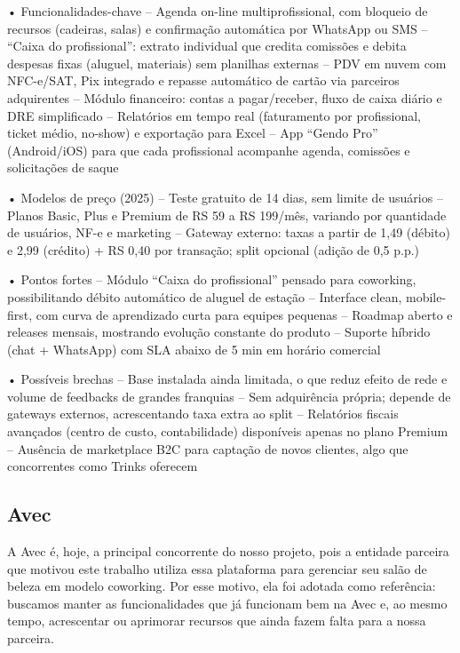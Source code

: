• Funcionalidades-chave
– Agenda on-line multi­profissional, com bloqueio de recursos (cadeiras, salas) e confirmação automática por WhatsApp ou SMS
– “Caixa do profissional”: extrato individual que credita comissões e debita despesas fixas (aluguel, materiais) sem planilhas externas
– PDV em nuvem com NFC-e/SAT, Pix integrado e repasse automático de cartão via parceiros adquirentes
– Módulo financeiro: contas a pagar/receber, fluxo de caixa diário e DRE simplificado
– Relatórios em tempo real (faturamento por profissional, ticket médio, no-show) e exportação para Excel
– App “Gendo Pro” (Android/iOS) para que cada profissional acompanhe agenda, comissões e solicitações de saque

• Modelos de preço (2025)
– Teste gratuito de 14 dias, sem limite de usuários
– Planos Basic, Plus e Premium de RS 59 a RS 199/mês, variando por quantidade de usuários, NF-e e marketing
– Gateway externo: taxas a partir de 1,49  (débito) e 2,99  (crédito) + RS 0,40 por transação; split opcional (adição de 0,5 p.p.)

• Pontos fortes
– Módulo “Caixa do profissional” pensado para coworking, possibilitando débito automático de aluguel de estação
– Interface clean, mobile-first, com curva de aprendizado curta para equipes pequenas
– Roadmap aberto e releases mensais, mostrando evolução constante do produto
– Suporte híbrido (chat + WhatsApp) com SLA abaixo de 5 min em horário comercial

• Possíveis brechas
– Base instalada ainda limitada, o que reduz efeito de rede e volume de feedbacks de grandes franquias
– Sem adquirência própria; depende de gateways externos, acrescentando taxa extra ao split
– Relatórios fiscais avançados (centro de custo, contabilidade) disponíveis apenas no plano Premium
– Ausência de marketplace B2C para captação de novos clientes, algo que concorrentes como Trinks oferecem

\subsection{Avec}

A Avec é, hoje, a principal concorrente do nosso projeto, pois a entidade parceira que motivou este trabalho utiliza essa plataforma para gerenciar seu salão de beleza em modelo coworking. Por esse motivo, ela foi adotada como referência: buscamos manter as funcionalidades que já funcionam bem na Avec e, ao mesmo tempo, acrescentar ou aprimorar recursos que ainda fazem falta para a nossa parceira.


